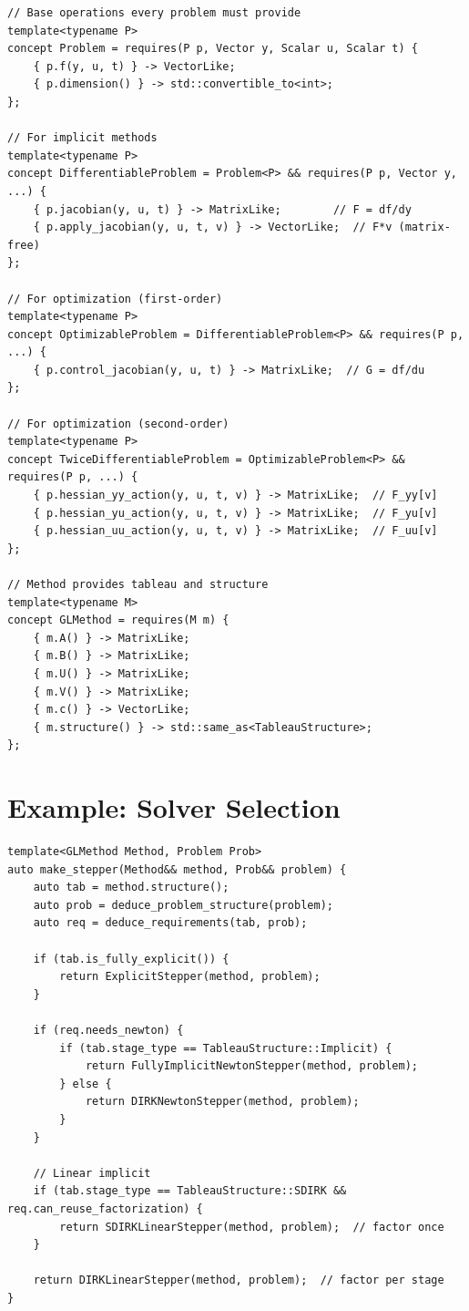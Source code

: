 \documentclass[11pt]{article}
\begin{document}
\begin{verbatim}
// Base operations every problem must provide
template<typename P>
concept Problem = requires(P p, Vector y, Scalar u, Scalar t) {
    { p.f(y, u, t) } -> VectorLike;
    { p.dimension() } -> std::convertible_to<int>;
};

// For implicit methods
template<typename P>
concept DifferentiableProblem = Problem<P> && requires(P p, Vector y, ...) {
    { p.jacobian(y, u, t) } -> MatrixLike;        // F = df/dy
    { p.apply_jacobian(y, u, t, v) } -> VectorLike;  // F*v (matrix-free)
};

// For optimization (first-order)
template<typename P>
concept OptimizableProblem = DifferentiableProblem<P> && requires(P p, ...) {
    { p.control_jacobian(y, u, t) } -> MatrixLike;  // G = df/du
};

// For optimization (second-order)
template<typename P>
concept TwiceDifferentiableProblem = OptimizableProblem<P> && requires(P p, ...) {
    { p.hessian_yy_action(y, u, t, v) } -> MatrixLike;  // F_yy[v]
    { p.hessian_yu_action(y, u, t, v) } -> MatrixLike;  // F_yu[v]
    { p.hessian_uu_action(y, u, t, v) } -> MatrixLike;  // F_uu[v]
};

// Method provides tableau and structure
template<typename M>
concept GLMethod = requires(M m) {
    { m.A() } -> MatrixLike;
    { m.B() } -> MatrixLike;
    { m.U() } -> MatrixLike;
    { m.V() } -> MatrixLike;
    { m.c() } -> VectorLike;
    { m.structure() } -> std::same_as<TableauStructure>;
};
\end{verbatim}

\section{Example: Solver Selection}

\begin{verbatim}
template<GLMethod Method, Problem Prob>
auto make_stepper(Method&& method, Prob&& problem) {
    auto tab = method.structure();
    auto prob = deduce_problem_structure(problem);
    auto req = deduce_requirements(tab, prob);
    
    if (tab.is_fully_explicit()) {
        return ExplicitStepper(method, problem);
    }
    
    if (req.needs_newton) {
        if (tab.stage_type == TableauStructure::Implicit) {
            return FullyImplicitNewtonStepper(method, problem);
        } else {
            return DIRKNewtonStepper(method, problem);
        }
    }
    
    // Linear implicit
    if (tab.stage_type == TableauStructure::SDIRK && req.can_reuse_factorization) {
        return SDIRKLinearStepper(method, problem);  // factor once
    }
    
    return DIRKLinearStepper(method, problem);  // factor per stage
}
\end{verbatim}
\end{document}
